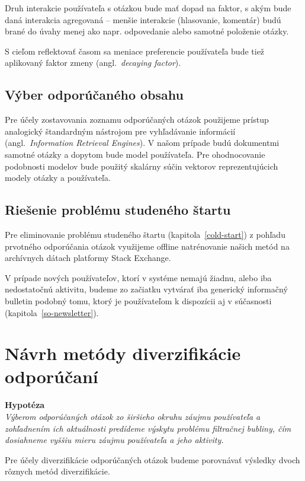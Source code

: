 Druh interakcie používateľa s otázkou bude mať dopad na faktor, s akým bude daná interakcia agregovaná -- menšie interakcie
(hlasovanie, komentár) budú brané do úvahy menej ako napr. odpovedanie alebo samotné položenie otázky.

S cieľom reflektovať časom sa meniace preferencie používateľa bude tiež aplikovaný faktor zmeny (angl.~\emph{decaying factor}).


\subsection{Výber odporúčaného obsahu}\label{rec-retrieval}

Pre účely zostavovania zoznamu odporúčaných otázok použijeme prístup analogický štandardným nástrojom pre vyhľadávanie
informácií (angl.~\emph{Information Retrieval Engines}). V našom prípade budú dokumentmi samotné otázky a dopytom bude
model používateľa. Pre ohodnocovanie podobnosti modelov bude použitý skalárny súčin vektorov reprezentujúcich
modely otázky a používateľa.


\subsection{Riešenie problému studeného štartu}

Pre eliminovanie problému studeného štartu (kapitola~\ref{cold-start}) z pohľadu prvotného odporúčania otázok využijeme
offline natrénovanie našich metód na archívnych dátach platformy Stack Exchange.

V prípade nových používateľov, ktorí v systéme nemajú žiadnu, alebo iba nedostatočnú aktivitu, budeme zo začiatku vytvárať
iba generický informačný bulletin podobný tomu, ktorý je používateľom k dispozícii aj v súčasnosti (kapitola~\ref{so-newsletter}).


\section{Návrh metódy diverzifikácie odporúčaní}

\textbf{Hypotéza}\\
\textit{Výberom odporúčaných otázok zo širšieho okruhu záujmu používateľa a zohľadnením ich aktuálnosti predídeme výskytu problému
filtračnej bubliny, čím dosiahneme vyššiu mieru záujmu používateľa a jeho aktivity.}

Pre účely diverzifikácie odporúčaných otázok budeme porovnávať výsledky dvoch rôznych metód diverzifikácie.

